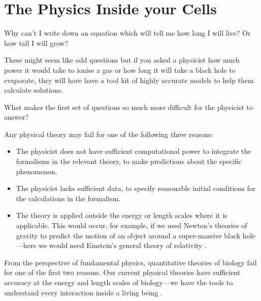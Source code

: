 

\section{The Physics Inside your Cells}

Why can't I write down an equation which will tell me how long I will live? Or how tall I will grow?

These might seem like odd questions but if you asked a physicist how much power it would take to ionise a gas or how long it will take a black hole to evaporate, they will have have a tool kit of highly accurate models to help them calculate solutions. 

What makes the first set of questions so much more difficult for the physicist to answer?

Any physical theory may fail for one of the following three reasons: 

\begin{itemize} 
	\item The physicist does not have sufficient computational power to integrate the formalisms in the relevant theory, to make predictions about the specific phenomenon.

		\item The physicist lacks sufficient data, to specify reasonable initial conditions for the calculations in the formalism. 

		\item The theory is applied outside the energy or length scales where it is applicable. This would occur, for example, if we used Newton's theories of gravity to predict the motion of an object around a super-massive black hole---here we would need Einstein's general theory of relativity \cite{picker2022}.

\end{itemize}

From the perspective of fundamental physics, quantitative theories of biology fail for one of the first two reasons. Our current physical theories have sufficient accuracy at the energy and length scales of biology---we have the tools to understand every interaction inside a living being \cite{carroll2021}. 

